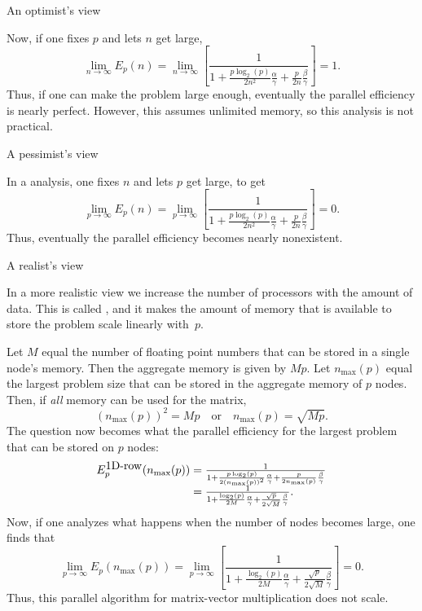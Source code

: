  {An optimist's view}

Now, if one fixes $ p $ and lets $ n $ get large,
\[
\lim_{n \rightarrow \infty} E_p( n ) =
\lim_{n \rightarrow \infty}
\left[
\frac{1}
{ 1 + \frac{p \log_2(p)}{2 n^2} \frac{\alpha}{\gamma} 
+ \frac{p}{2 n} \frac{\beta}{\gamma} }
\right]
=
1.
\]
Thus, if one can make the problem large enough, eventually the parallel
efficiency is nearly perfect. However, this assumes unlimited memory,
so this analysis is not practical.



 {A pessimist's view}

In a  analysis,
one fixes $ n $ and lets $ p $ get large, to get
\[
\lim_{p \rightarrow \infty} E_p( n ) =
\lim_{p \rightarrow \infty}
\left[
\frac{1}
{1 + \frac{p \log_2(p)}{2 n^2} \frac{\alpha}{\gamma} 
+ \frac{p}{2 n} \frac{\beta}{\gamma} }
\right]
=
0.
\]
Thus, eventually the parallel efficiency becomes nearly nonexistent.

 {A realist's view}

In a more realistic view we increase the number of processors with the
amount of data. This is called , and 
it makes the amount of memory that is available to
store the problem scale linearly with~$ p $.  

Let $ M $ equal the
number of floating point numbers that can be stored in a single node's
memory.  Then the aggregate memory is given by $ M p $.  Let $
n_{\max}(p) $ equal the largest problem size that can be stored
in the aggregate memory of $ p $ nodes.  Then, if {\em all} memory can
be used for the matrix,
\[
(n_{\max}(p))^2 = M p
\quad
\mbox{or}
\quad
n_{\max}(p) = \sqrt{Mp}.
\]
The question now becomes what the parallel 
efficiency for the largest problem that can be stored on $ p $ nodes:
\[ 
\begin{array}{r@{{}={}}l}
E_p^{\mbox{1D-row}}(n_{\max}(p)) &
\frac{1}
{1 + \frac{p \log_2(p)}{2 (n_{\max}(p))^2} \frac{\alpha}{\gamma} 
+ \frac{p}{2 n_{\max}(p)} \frac{\beta}{\gamma} }
\\
&
\frac{1}
{ 1 + \frac{\log_2(p)}{2 M} \frac{\alpha}{\gamma} 
+ \frac{\sqrt{p}}{2 \sqrt{M}} \frac{\beta}{\gamma} }.
\end{array}
\]
Now, if one analyzes what happens when the number of nodes
becomes large, one finds that
\[
\lim_{p \rightarrow \infty} E_p( n_{\max}(p) ) 
=
\lim_{p \rightarrow \infty}
\left[
\frac{1}
{1 + \frac{\log_2(p)}{2 M} \frac{\alpha}{\gamma} 
+ \frac{\sqrt{p}}{2 \sqrt{M}} \frac{\beta}{\gamma} }
\right]
=
0.
\]
Thus, this parallel algorithm for matrix-vector multiplication does
not scale. 

